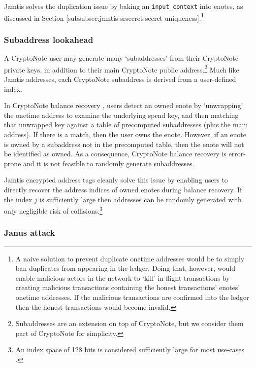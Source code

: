 Jamtis solves the duplication issue by baking an {\tt input\_context} into enotes, as discussed in Section \ref{subsubsec:jamtis-srsecret-secret-uniqueness}.\footnote{A naive solution to prevent duplicate onetime addresses would be to simply ban duplicates from appearing in the ledger. Doing that, however, would enable malicious actors in the network to `kill' in-flight transactions by creating malicious transactions containing the honest transactions' enotes' onetime addresses. If the malicious transactions are confirmed into the ledger then the honest transactions would become invalid.}

\subsubsection{Subaddress lookahead}
\label{subsubsec:jamtis-cryptonote-flaws-subaddr-lookahead}

A CryptoNote user may generate many `subaddresses' \cite{MRL-0006-subaddresses} from their CryptoNote private keys, in addition to their main CryptoNote public address.\footnote{Subaddresses are an extension on top of CryptoNote, but we consider them part of CryptoNote for simplicity.} Much like Jamtis addresses, each CryptoNote subaddress is derived from a user-defined index.

In CryptoNote balance recovery \cite{cryptoNoteWhitePaper, ztm-2}, users detect an owned enote by `unwrapping' the onetime address to examine the underlying spend key, and then matching that unwrapped key against a table of precomputed subaddresses (plus the main address). If there is a match, then the user owns the enote. However, if an enote is owned by a subaddress not in the precomputed table, then the enote will not be identified as owned. As a consequence, CryptoNote balance recovery is error-prone and it is not feasible to randomly generate subaddresses.

Jamtis encrypted address tags cleanly solve this issue by enabling users to directly recover the address indices of owned enotes during balance recovery. If the index $j$ is sufficiently large then addresses can be randomly generated with only negligible risk of collisions.\footnote{An index space of 128 bits is considered sufficiently large for most use-cases \cite{uuid-rfc4122}.}

\subsubsection{Janus attack}
\label{subsubsec:jamtis-cryptonote-flaws-janus}

